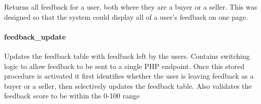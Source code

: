 Returns all feedback for a user, both where they are a buyer or a
seller. This was designed so that the system could display all of a
user's feedback on one page.

\begin{Shaded}
\begin{Highlighting}[]
  \NormalTok{(}\NormalTok{))}
     
         
     
       
      

\end{Highlighting}
\end{Shaded}

\paragraph{feedback\_update}\label{feedbackux5fupdate}

Updates the feedback table with feedback left by the users. Contains
switching logic to allow feedback to be sent to a single PHP endpoint.
Once this stored procedure is activated it first identifies whether the
user is leaving feedback as a buyer or a seller, then selectively
updates the feedback table. Also validates the feedback score to be
within the 0-100 range

